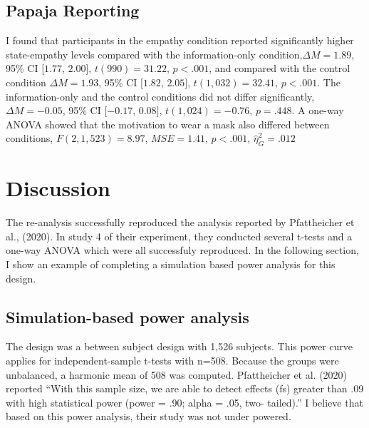 \documentclass[
  english,
  man]{apa6}
\begin{document}
\hypertarget{papaja-reporting}{%
\subsection{Papaja Reporting}\label{papaja-reporting}}

I found that participants in the empathy condition reported significantly higher state-empathy levels compared with the information-only condition,\(\Delta M = 1.89\), 95\% CI \([1.77\), \(2.00]\), \(t(990) = 31.22\), \(p < .001\), and compared with the control condition \(\Delta M = 1.93\), 95\% CI \([1.82\), \(2.05]\), \(t(1,032) = 32.41\), \(p < .001\). The information-only and the control conditions did not differ significantly, \(\Delta M = -0.05\), 95\% CI \([-0.17\), \(0.08]\), \(t(1,024) = -0.76\), \(p = .448\). A one-way ANOVA showed that the motivation to wear a mask also differed between conditions, \(F(2, 1,523) = 8.97\), \(\mathit{MSE} = 1.41\), \(p < .001\), \(\hat{\eta}^2_G = .012\)

\hypertarget{discussion}{%
\section{Discussion}\label{discussion}}

The re-analysis successfully reproduced the analysis reported by Pfattheicher et al., (2020). In study 4 of their experiment, they conducted several t-tests and a one-way ANOVA which were all successfuly reproduced. In the following section, I show an example of completing a simulation based power analysis for this design.

\hypertarget{simulation-based-power-analysis}{%
\subsection{Simulation-based power analysis}\label{simulation-based-power-analysis}}

The design was a between subject design with 1,526 subjects. This power curve applies for independent-sample t-tests with n=508. Because the groups were unbalanced, a harmonic mean of 508 was computed. Pfattheicher et al. (2020) reported \enquote{With this sample size, we are able to detect effects (fs) greater than .09 with high statistical power (power = .90; alpha = .05, two- tailed).} I believe that based on this power analysis, their study was not under powered.
\end{document}
